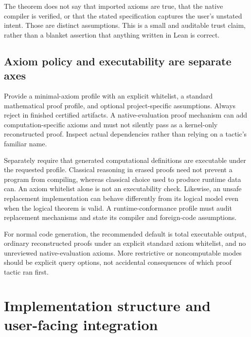 The theorem does not say that imported axioms are true, that the native compiler is verified, or that the stated specification captures the user's unstated intent. Those are distinct assumptions. This is a small and auditable trust claim, rather than a blanket assertion that anything written in Lean is correct.

\subsection{Axiom policy and executability are separate axes}
Provide a minimal-axiom profile with an explicit whitelist, a standard mathematical proof profile, and optional project-specific assumptions. Always reject  in finished certified artifacts. A native-evaluation proof mechanism can add computation-specific axioms and must not silently pass as a kernel-only reconstructed proof. Inspect actual dependencies rather than relying on a tactic's familiar name.\cite{axioms,validation}

Separately require that generated computational definitions are executable under the requested profile. Classical reasoning in erased proofs need not prevent a program from compiling, whereas classical choice used to produce runtime data can. An axiom whitelist alone is not an executability check. Likewise, an unsafe replacement implementation can behave differently from its logical model even when the logical theorem is valid. A runtime-conformance profile must audit replacement mechanisms and state its compiler and foreign-code assumptions.\cite{axioms,recursion}

For normal code generation, the recommended default is total executable output, ordinary reconstructed proofs under an explicit standard axiom whitelist, and no unreviewed native-evaluation axioms. More restrictive or noncomputable modes should be explicit query options, not accidental consequences of which proof tactic ran first.

\section{Implementation structure and user-facing integration}
\label{sec:implementation}
